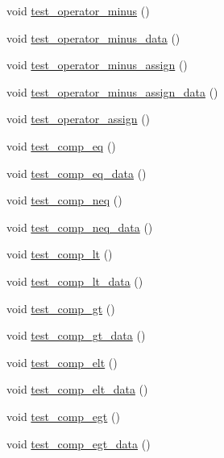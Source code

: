 \begin{DoxyCompactItemize}
\item 
void \hyperlink{classdefault__coordinate_a2463062e598f41469a914e98b5dc854c}{test\-\_\-operator\-\_\-minus} ()
\item 
void \hyperlink{classdefault__coordinate_a70361e17e1f04ec66e5a69600efbf825}{test\-\_\-operator\-\_\-minus\-\_\-data} ()
\item 
void \hyperlink{classdefault__coordinate_af8a4fdae768857a0f44d4ad4097b4809}{test\-\_\-operator\-\_\-minus\-\_\-assign} ()
\item 
void \hyperlink{classdefault__coordinate_a85986ef5c89e795409c2768de91374ad}{test\-\_\-operator\-\_\-minus\-\_\-assign\-\_\-data} ()
\item 
void \hyperlink{classdefault__coordinate_ab40158075fa6172ecf6d920692d77f07}{test\-\_\-operator\-\_\-assign} ()
\item 
void \hyperlink{classdefault__coordinate_a6782b4cbf116fd532cd24aa124114647}{test\-\_\-comp\-\_\-eq} ()
\item 
void \hyperlink{classdefault__coordinate_a79b6f2cb5036b81ee9065bfb229407a9}{test\-\_\-comp\-\_\-eq\-\_\-data} ()
\item 
void \hyperlink{classdefault__coordinate_a62f69b8f3c4b13d1a19f888a535c1a05}{test\-\_\-comp\-\_\-neq} ()
\item 
void \hyperlink{classdefault__coordinate_a65d7a41b67e6c5075e3f7fef9408fb9e}{test\-\_\-comp\-\_\-neq\-\_\-data} ()
\item 
void \hyperlink{classdefault__coordinate_afc1c3cb28786b5541c43d737f01d6c11}{test\-\_\-comp\-\_\-lt} ()
\item 
void \hyperlink{classdefault__coordinate_a4bdc273fc3d3afc49538b71a9adfab34}{test\-\_\-comp\-\_\-lt\-\_\-data} ()
\item 
void \hyperlink{classdefault__coordinate_ac7aefb8e1de41575fb1575ea2a433c33}{test\-\_\-comp\-\_\-gt} ()
\item 
void \hyperlink{classdefault__coordinate_abed751bd23e0a376c1936619180f65eb}{test\-\_\-comp\-\_\-gt\-\_\-data} ()
\item 
void \hyperlink{classdefault__coordinate_a26c8d9d10a130b4a0e38dfede89b8f78}{test\-\_\-comp\-\_\-elt} ()
\item 
void \hyperlink{classdefault__coordinate_a5d1b77894f89c13449f4adeff5dd672c}{test\-\_\-comp\-\_\-elt\-\_\-data} ()
\item 
void \hyperlink{classdefault__coordinate_a3e141673c8500ca0a12c8bfb5a94b3e9}{test\-\_\-comp\-\_\-egt} ()
\item 
void \hyperlink{classdefault__coordinate_af0c0b6109339ba69c910fde934b0a301}{test\-\_\-comp\-\_\-egt\-\_\-data} ()
\end{DoxyCompactItemize}
